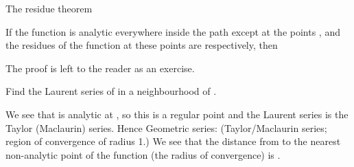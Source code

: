 \EMhold


\begin{EMtheorem}{The residue theorem}

If the function  is analytic everywhere inside the path  except at the points , and the residues of the function at these points are  respectively, then

\end{EMtheorem}

\begin{EMunit}


\end{EMunit}

The proof is left to the reader as an exercise.

\EMhold


\begin{EMexample}{}

Find the Laurent series of  in a neighbourhood of .

We see that  is analytic at , so this is a regular point and the Laurent series is the Taylor (Maclaurin) series. Hence
Geometric series:
(Taylor/Maclaurin series; region of convergence of radius 1.)
We see that the distance from  to the nearest non-analytic point of the function (the radius of convergence) is .

\end{EMexample}

\begin{EMunit}


\end{EMunit}

